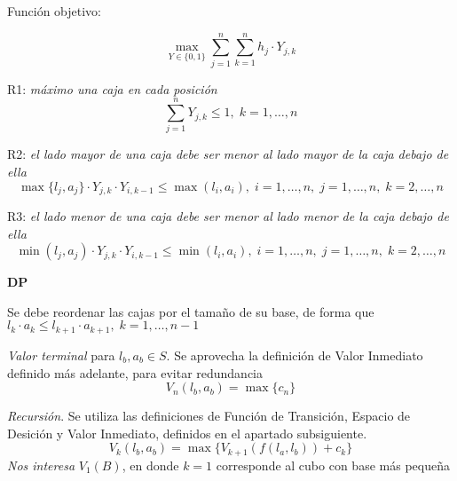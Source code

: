\documentclass[letterpaper,10pt]{article}
\begin{document}
Función objetivo:

$$\max_{Y \in \{0,1\}} \sum\limits_{j=1}^{n}\sum\limits_{k=1}^{n} h_j\cdot Y_{j,k} $$




R1: \textit{máximo una caja en cada posición}
$$\sum\limits_{j=1}^{n}Y_{j,k} \leq 1, \; k = 1, \ldots, n$$

R2: \textit{el lado mayor de una caja debe ser menor al lado mayor de la caja debajo de ella}
 $$\max\{l_j, a_j\}\cdot Y_{j,k}\cdot Y_{i,k-1} \leq \max(l_i, a_i), \; i = 1, \ldots, n, \; j = 1, \ldots, n, \; k = 2, \ldots, n$$

R3: \textit{el lado menor de una caja debe ser menor al lado menor de la caja debajo de ella}
$$\min(l_j, a_j)\cdot Y_{j,k}\cdot Y_{i,k-1} \leq \min(l_i, a_i), \; i = 1, \ldots, n, \; j = 1, \ldots, n, \; k = 2, \ldots, n$$

\textbf{DP}

Se debe reordenar las cajas por el tamaño de su base, de forma que $l_k\cdot  a_k \leq l_{k+1}\cdot a_{k+1}, \; k = 1, \ldots, n-1$

\textit{Valor terminal} para $l_b, a_b \in S$. Se aprovecha la definición de Valor Inmediato definido más adelante, para evitar redundancia
$$V_n(l_b, a_b) = \max\{c_n\}$$

\textit{Recursión}. Se utiliza las definiciones de Función de Transición, Espacio de Desición y Valor Inmediato, definidos en el apartado subsiguiente.
$$V_k(l_b, a_b) = \max\{V_{k+1}(f(l_a, l_b)) + c_k\}$$
\textit{Nos interesa} $V_1(B)$, en donde $k=1$ corresponde al cubo con base más pequeña
\end{document}

